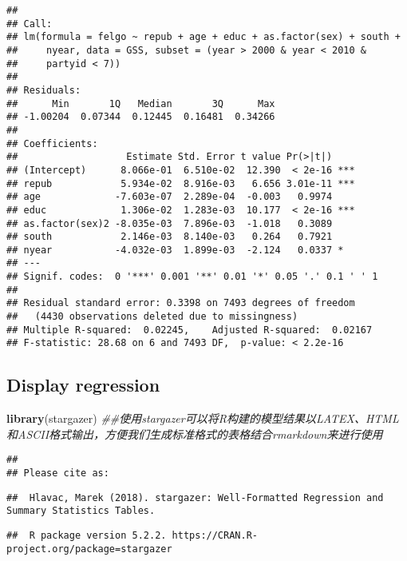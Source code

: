 \documentclass[]{article}
\newenvironment{Shaded}{\begin{snugshade}}{\end{snugshade}}
\newcommand{\CommentTok}[1]{\textcolor[rgb]{0.56,0.35,0.01}{\textit{#1}}}
\newcommand{\KeywordTok}[1]{\textcolor[rgb]{0.13,0.29,0.53}{\textbf{#1}}}
\newcommand{\NormalTok}[1]{#1}
\begin{document}
\begin{verbatim}
## 
## Call:
## lm(formula = felgo ~ repub + age + educ + as.factor(sex) + south + 
##     nyear, data = GSS, subset = (year > 2000 & year < 2010 & 
##     partyid < 7))
## 
## Residuals:
##      Min       1Q   Median       3Q      Max 
## -1.00204  0.07344  0.12445  0.16481  0.34266 
## 
## Coefficients:
##                   Estimate Std. Error t value Pr(>|t|)    
## (Intercept)      8.066e-01  6.510e-02  12.390  < 2e-16 ***
## repub            5.934e-02  8.916e-03   6.656 3.01e-11 ***
## age             -7.603e-07  2.289e-04  -0.003   0.9974    
## educ             1.306e-02  1.283e-03  10.177  < 2e-16 ***
## as.factor(sex)2 -8.035e-03  7.896e-03  -1.018   0.3089    
## south            2.146e-03  8.140e-03   0.264   0.7921    
## nyear           -4.032e-03  1.899e-03  -2.124   0.0337 *  
## ---
## Signif. codes:  0 '***' 0.001 '**' 0.01 '*' 0.05 '.' 0.1 ' ' 1
## 
## Residual standard error: 0.3398 on 7493 degrees of freedom
##   (4430 observations deleted due to missingness)
## Multiple R-squared:  0.02245,    Adjusted R-squared:  0.02167 
## F-statistic: 28.68 on 6 and 7493 DF,  p-value: < 2.2e-16
\end{verbatim}

\hypertarget{display-regression}{%
\subsection{Display regression}\label{display-regression}}

\begin{Shaded}
\begin{Highlighting}[]
\KeywordTok{library}\NormalTok{(stargazer) }\CommentTok{##使用stargazer可以将R构建的模型结果以LATEX、HTML和ASCII格式输出，方便我们生成标准格式的表格结合rmarkdown来进行使用}
\end{Highlighting}
\end{Shaded}

\begin{verbatim}
## 
## Please cite as:
\end{verbatim}

\begin{verbatim}
##  Hlavac, Marek (2018). stargazer: Well-Formatted Regression and Summary Statistics Tables.
\end{verbatim}

\begin{verbatim}
##  R package version 5.2.2. https://CRAN.R-project.org/package=stargazer
\end{verbatim}
\end{document}
